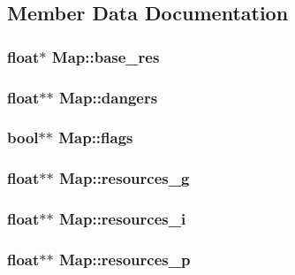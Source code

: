 \subsection{Member Data Documentation}
\hypertarget{class_map_a9fc5f65a162ff0459b3d23ba33b2b1e1}{
\subsubsection[{base\-\_\-res}]{\setlength{\rightskip}{0pt plus 5cm}float$\ast$ Map\-::base\-\_\-res}}\label{class_map_a9fc5f65a162ff0459b3d23ba33b2b1e1}
\hypertarget{class_map_a72f5c51d7ba90727fcdff153b480c187}{
\subsubsection[{dangers}]{\setlength{\rightskip}{0pt plus 5cm}float$\ast$$\ast$ Map\-::dangers}}\label{class_map_a72f5c51d7ba90727fcdff153b480c187}
\hypertarget{class_map_a496e559b2c5898e1622c962e6aa5e070}{
\subsubsection[{flags}]{\setlength{\rightskip}{0pt plus 5cm}bool$\ast$$\ast$ Map\-::flags}}\label{class_map_a496e559b2c5898e1622c962e6aa5e070}
\hypertarget{class_map_a49a8163af842ed1d63f5d3d842f43c89}{
\subsubsection[{resources\-\_\-g}]{\setlength{\rightskip}{0pt plus 5cm}float$\ast$$\ast$ Map\-::resources\-\_\-g}}\label{class_map_a49a8163af842ed1d63f5d3d842f43c89}
\hypertarget{class_map_a12ce9d7050191ba2f084e7e11cc41ab5}{
\subsubsection[{resources\-\_\-i}]{\setlength{\rightskip}{0pt plus 5cm}float$\ast$$\ast$ Map\-::resources\-\_\-i}}\label{class_map_a12ce9d7050191ba2f084e7e11cc41ab5}
\hypertarget{class_map_a910f29ebb50c629a05c0945eb6c785ea}{
\subsubsection[{resources\-\_\-p}]{\setlength{\rightskip}{0pt plus 5cm}float$\ast$$\ast$ Map\-::resources\-\_\-p}}\label{class_map_a910f29ebb50c629a05c0945eb6c785ea}


